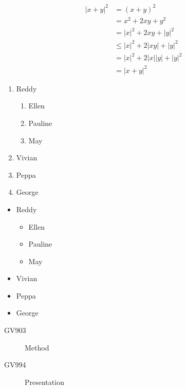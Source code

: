 \documentclass[12pt]{article}
\begin{document}
\begin{align*}
|x+y|^2 &=(x+y)^2\\
&=x^2+2xy+y^2\\
&=|x|^2+2xy+|y|^2\\
&\leq|x|^2+2|xy|+|y|^2\\
&=|x|^2+2|x||y|+|y|^2\\
&=|x+y|^2
\end{align*}

\begin{enumerate}
\item Reddy
		\begin{enumerate}
		\item Ellen
		\item Pauline
		\item May
		\end{enumerate}
\item Vivian
\item Peppa
\item George
\end{enumerate}

\begin{itemize}
\item Reddy
		\begin{itemize}
		\item Ellen
		\item Pauline
		\item May
		\end{itemize}
\item Vivian
\item Peppa
\item George
\end{itemize}

\begin{description}
\item [GV903] {Method}
\item [GV994] {Presentation}
\end{description}
\end{document}
